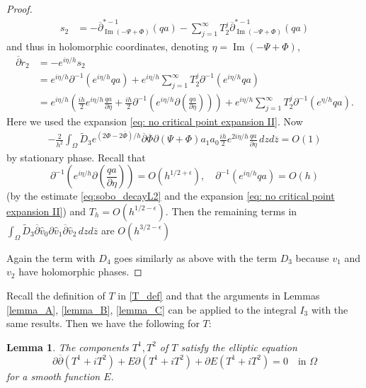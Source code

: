 \documentclass[a4paper, 10pt, twoside, notitlepage]{amsart}
\theoremstyle{plain}
\newtheorem{lem}[prop]{Lemma}
\newcommand{\Om}{\Omega}
\numberwithin{equation}{section}
\newcommand {\p} {\partial}
\newcommand{\e}{\epsilon}
\newcommand{\dbar}{\ol{\p}}
\newcommand{\ol}[1]{\overline{#1}}
\newcommand{\oz}{\overline{z}}
\DeclareMathOperator {\Imm} {Im}
\newcommand{\op}{\overline \p}
\begin{document}
\begin{proof}
\begin{align*}
		s_2 &= -\op_{\Imm(-\Psi + \Phi)}^{*-1}(qa) - \sum_{j=1}^{\infty}T_2^j\op_{\Imm(-\Psi + \Phi)}^{*-1}(qa)
	\end{align*}
	and thus in holomorphic coordinates, denoting $\eta= \Imm(-\Psi + \Phi)$,
	\begin{align*}
		\dbar r_2 &= -e^{i\eta/h}s_2\\
		&= e^{i\eta/h}\p^{-1}(e^{i\eta/h}qa) + e^{i\eta/h}\sum_{j=1}^{\infty}T_2^j\p^{-1}(e^{i\eta/h}qa)\\
		&= e^{i\eta/h}\left(\frac{ih}{2}e^{i\eta/h}\frac{qa}{\p\eta} + \frac{ih}{2}\p^{-1}\left(e^{i\eta/h}\p\left(\frac{qa}{\p\eta}\right)\right)\right) + e^{i\eta/h}\sum_{j=1}^{\infty}T_2^j\p^{-1}(e^{\eta/h}qa).
	\end{align*}
    Here we used the expansion \eqref{eq: no critical point expansion II}.
	Now
	\begin{align*}
		-\frac{2}{h^2}\int_{\Om}\tilde D_3 e^{(2\Phi -2\ol{\Phi})/h}\dbar\ol{\Phi}\p(\Psi+\Phi)a_1a_0\frac{ih}{2}e^{2i\eta/h}\frac{qa}{\p\eta}\,dzd\oz = O(1)
	\end{align*}
	by stationary phase.
	Recall that 
    $$\p^{-1}\left(e^{i\eta/h}\p\left(\frac{qa}{\p\eta}\right)\right) = O(h^{1/2+\e}),\quad \p^{-1}(e^{i\eta/h}qa) = O(h)$$
    (by the estimate \eqref{eq:sobo_decayL2} and the expansion \eqref{eq: no critical point expansion II}) and $T_h = O(h^{1/2-\e})$. Then the remaining terms in $\int_{\Om}\tilde D_3 \dbar \hat{v}_0\p \hat{v}_1\dbar \hat{v}_2\,dzd\oz$ are $O(h^{3/2-\e})$
	
	Again the term with $D_4$ goes similarly as above with the term $D_3$ because $v_1$ and $v_2$ have holomorphic phases.
\end{proof}
Recall the definition of $T$ in \eqref{T_def} and that the arguments in Lemmas \ref{lemma_A}, \ref{lemma_B}, \ref{lemma_C} can be applied to the integral $I_3$ with the same results. Then we have the following for $T$:
\begin{lem}\label{T_PDE_1}
	The components $T^1, T^2$ of $T$ satisfy the elliptic equation
	\begin{equation}\label{T^k_equation}
		\p\dbar(T^1+iT^2) + E\p(T^1 + iT^2) + \p E(T^1 + iT^2) = 0\quad \text{in  }\Om
	\end{equation}
	for a smooth function $E$.
\end{lem}
\end{document}
